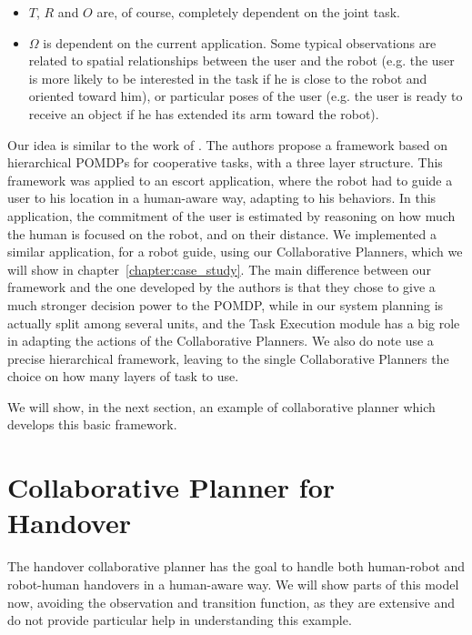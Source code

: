 \begin{itemize}
	\item $T$, $R$ and $O$ are, of course, completely dependent on the joint task.
	\item $\Omega$ is dependent on the current application. Some typical observations are related to spatial relationships between the user and the robot (e.g. the user is more likely to be interested in the task if he is close to the robot and oriented toward him), or particular poses of the user (e.g. the user is ready to receive an object if he has extended its arm toward the robot).

\end{itemize}

Our idea is similar to the work of \cite{ferrari2015hierarchical}. The authors propose a framework based on hierarchical POMDPs for cooperative tasks, with a three layer structure. This framework was applied to an escort application, where the robot had to guide a user to his location in a human-aware way, adapting to his behaviors. In this application, the commitment of the user is estimated by reasoning on how much the human is focused on the robot, and on their distance.
We implemented a similar application, for a robot guide, using our Collaborative Planners, which we will show in chapter~\ref{chapter:case_study}. The main difference between our framework and the one developed by the authors is that they chose to give a much stronger decision power to the POMDP, while in our system planning is actually split among several units, and the Task Execution module has a big role in adapting the actions of the Collaborative Planners. We also do note use a precise hierarchical framework, leaving to the single Collaborative Planners the choice on how many layers of task to use.

We will show, in the next section, an example of collaborative planner which develops this basic framework.

\section{Collaborative Planner for Handover}
\label{sec:task_execution-handover}
The handover collaborative planner has the goal to handle both human-robot and robot-human handovers in a human-aware way. We will show parts of this model now, avoiding the observation and transition function, as they are extensive and do not provide particular help in understanding this example.

